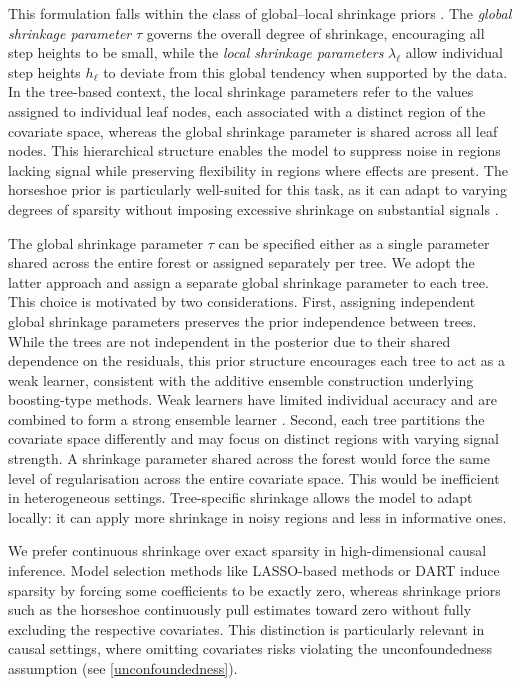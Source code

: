 This formulation falls within the class of global--local shrinkage priors \citep{PolsonScott2011}. 
The \textit{global shrinkage parameter} $\tau$ governs the overall degree of shrinkage, encouraging all step heights to be small, while the \textit{local shrinkage parameters} $\lambda_\ell$ allow individual step heights $h_\ell$ to deviate from this global tendency when supported by the data. 
In the tree-based context, the local shrinkage parameters refer to the values assigned to individual leaf nodes, each associated with a distinct region of the covariate space, whereas the global shrinkage parameter is shared across all leaf nodes. 
This hierarchical structure enables the model to suppress noise in regions lacking signal while preserving flexibility in regions where effects are present. 
The horseshoe prior is particularly well-suited for this task, as it can adapt to varying degrees of sparsity without imposing excessive shrinkage on substantial signals \citep{vdPas2017, vdPas2017Horseshoe, bhadra2019lasso}.

The global shrinkage parameter $\tau$ can be specified either as a single parameter shared across the entire forest or assigned separately per tree.
We adopt the latter approach and assign a separate global shrinkage parameter to each tree. 
This choice is motivated by two considerations. 
First, assigning independent global shrinkage parameters preserves the prior independence between trees.
While the trees are not independent in the posterior due to their shared dependence on the residuals, this prior structure encourages each tree to act as a weak learner, consistent with the additive ensemble construction underlying boosting-type methods.
Weak learners have limited individual accuracy and are combined to form a strong ensemble learner \citep{Schapire1990WeakLearnability, Freund1997Boosting}.
Second, each tree partitions the covariate space differently and may focus on distinct regions with varying signal strength. 
A shrinkage parameter shared across the forest would force the same level of regularisation across the entire covariate space.
This would be inefficient in heterogeneous settings.
Tree-specific shrinkage allows the model to adapt locally: it can apply more shrinkage in noisy regions and less in informative ones.


We prefer continuous shrinkage over exact sparsity in high-dimensional causal inference.
Model selection methods like LASSO-based methods \citep{Belloni2014, Shortreed2017} or DART \citep{linero2018dirichlet} induce sparsity by forcing some coefficients to be exactly zero, whereas shrinkage priors such as the horseshoe continuously pull estimates toward zero without fully excluding the respective covariates. 
This distinction is particularly relevant in causal settings, where omitting covariates risks violating the unconfoundedness assumption (see \eqref{unconfoundedness}).

